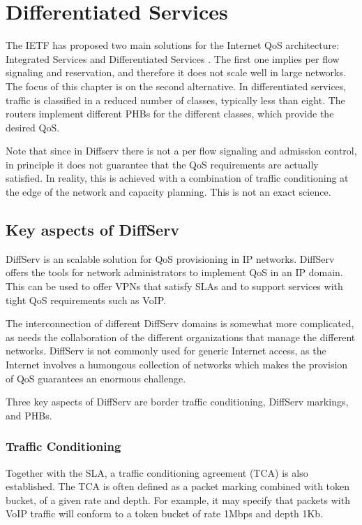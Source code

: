 \chapter{Differentiated Services}

The IETF has proposed two main solutions for the Internet QoS architecture: Integrated Services and Differentiated Services \cite{rfc2475}.
The first one implies per flow signaling and reservation, and therefore it does not scale well in large networks.
The focus of this chapter is on the second alternative.
In differentiated services, traffic is classified in a reduced number of classes, typically less than eight.
The routers implement different PHBs for the different classes, which provide the desired QoS.

Note that since in Diffserv there is not a per flow signaling and admission control, in principle it does not guarantee that the QoS requirements are actually satisfied.
In reality, this is achieved with a combination of traffic conditioning at the edge of the network and capacity planning.
This is not an exact science.

\section{Key aspects of DiffServ}
DiffServ is an scalable solution for QoS provisioning in IP networks.
DiffServ offers the tools for network administrators to implement QoS in an IP domain.
This can be used to offer VPNs that satisfy SLAs and to support services with tight QoS requirements such as VoIP.

The interconnection of different DiffServ domains is somewhat more complicated, as needs the collaboration of the different organizations that manage the different networks.
DiffServ is not commonly used for generic Internet access, as the Internet involves a humongous collection of networks which makes the provision of QoS guarantees an enormous challenge.

Three key aspects of DiffServ are border traffic conditioning, DiffServ markings, and PHBs.

\subsection{Traffic Conditioning}

Together with the SLA, a traffic conditioning agreement (TCA) is also established.
The TCA is often defined as a packet marking combined with token bucket, of a given rate and depth.
For example, it may specify that packets with VoIP traffic will conform to a token bucket of rate 1Mbps and depth 1Kb.

